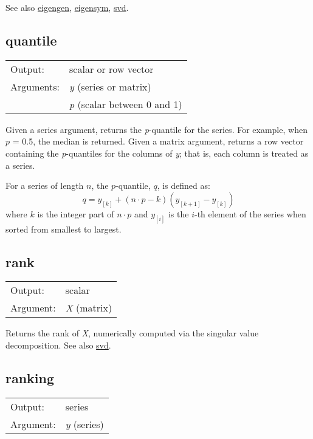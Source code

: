 	  See also \hyperlink{func-eigengen}{eigengen}, \hyperlink{func-eigensym}{eigensym}, \hyperlink{func-svd}{svd}.

\subsection{quantile}
\hypertarget{func-quantile}{}

\begin{tabular}{ll}
Output:     & scalar or row vector\\
Arguments:  & \textsl{y} (series or matrix)\\
           & \textsl{p} (scalar between 0 and 1)\\
\end{tabular}

	  Given a series argument, returns the
	  \textsl{p}-quantile for the series. For example, when
	  \ensuremath{p} = 0.5, the median is returned. Given a
	  matrix argument, returns a row vector containing the 
	  \textsl{p}-quantiles for the columns of 
	  \textsl{y}; that is, each column is treated
	  as a series.

	  For a series of length $n$, the $p$-quantile, $q$, is defined
	  as:
	  \[q = y_{[k]} + (n \cdot p - k) (y_{[k+1]} - y_{[k]})\] 
	  where $k$ is the integer part of $n \cdot p$ and 
	  $y_{[i]}$ is the $i$-th element of the series when
	  sorted from smallest to largest.

\subsection{rank}
\hypertarget{func-rank}{}

\begin{tabular}{ll}
Output:     & scalar\\
Argument:   & \textsl{X} (matrix)\\
\end{tabular}

	  Returns the rank of \textsl{X}, numerically computed
	  via the singular value decomposition. 
	  See also \hyperlink{func-svd}{svd}.

\subsection{ranking}
\hypertarget{func-ranking}{}

\begin{tabular}{ll}
Output:     & series\\
Argument:   & \textsl{y} (series)\\
\end{tabular}

